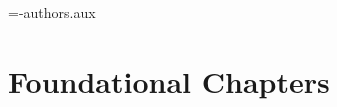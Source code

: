 \documentclass[11pt,fleqn,A4paper]{book} %
\begin{document}


\immediate\openout\authorfile=\jobname-authors.aux%




\part{Foundational Chapters}


\end{document}
